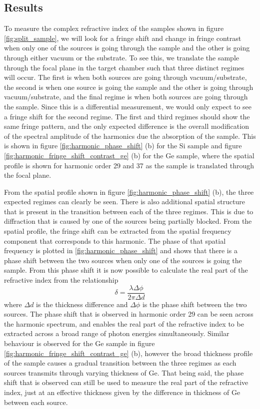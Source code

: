 \subsection{Results}
To measure the complex refractive index of the samples shown in figure \ref{fig:split_sample}, we will look for a fringe shift and change in fringe contrast when only one of the sources is going through the sample and the other is going through either vacuum or the substrate.  To see this, we translate the sample through the focal plane in the target chamber such that three distinct regimes will occur.  The first is when both sources are going through vacuum/substrate, the second is when one source is going the sample and the other is going through vacuum/substrate, and the final regime is when both sources are going through the sample.  Since this is a differential measurement, we would only expect to see a fringe shift for the second regime.  The first and third regimes should show the same fringe pattern, and the only expected difference is the overall modification of the spectral amplitude of the harmonics due the absorption of the sample.  This is shown in figure \ref{fig:harmonic_phase_shift} (b) for the Si sample and figure \ref{fig:harmonic_fringe_shift_contrast_ge} (b) for the Ge sample, where the spatial profile is shown for harmonic order 29 and 37 as the sample is translated through the focal plane.

From the spatial profile shown in figure \ref{fig:harmonic_phase_shift} (b), the three expected regimes can clearly be seen.  There is also additional spatial structure that is present in the transition between each of the three regimes.  This is due to diffraction that is caused by one of the sources being partially blocked.  From the spatial profile, the fringe shift can be extracted from the spatial frequency component that corresponds to this harmonic.  The phase of that spatial frequency is plotted in \ref{fig:harmonic_phase_shift} and shows that there is a phase shift between the two sources when only one of the sources is going the sample.  From this phase shift it is now possible to calculate the real part of the refractive index from the relationship
\begin{equation}
	\label{eqn:fringe_shift_x}
	\delta = \frac{\lambda\Delta\phi}{2\pi\Delta d}
\end{equation}  
where $\Delta d$ is the thickness difference and $\Delta \phi$ is the phase shift between the two sources.  The phase shift that is observed in harmonic order 29 can be seen across the harmonic spectrum, and enables the real part of the refractive index to be extracted across a broad range of photon energies simultaneously.  Similar behaviour is observed for the Ge sample in figure \ref{fig:harmonic_fringe_shift_contrast_ge} (b), however the broad thickness profile of the sample causes a gradual transition between the three regimes as each sources transmits through varying thickness of Ge.  That being said, the phase shift that is observed can still be used to measure the real part of the refractive index, just at an effective thickness given by the difference in thickness of Ge between each source.

